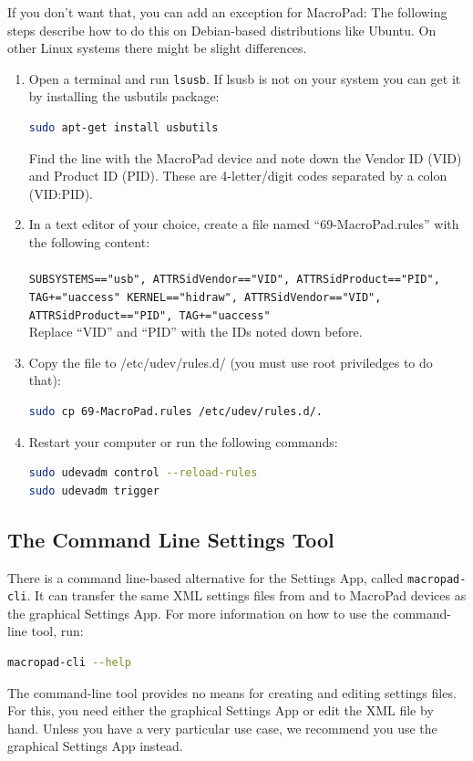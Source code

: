 \documentclass{article}
\begin{document}
If you don't want that, you can add an exception for MacroPad: The following steps describe how to do this on Debian-based distributions like Ubuntu. On other Linux systems there might be slight differences.
\begin{enumerate}
\item Open a terminal and run \lstinline[language=bash]{lsusb}.
If lsusb is not on your system you can get it by installing the usbutils package:
\begin{lstlisting}[language=bash]
sudo apt-get install usbutils
\end{lstlisting}
Find the line with the MacroPad device and note down the Vendor ID (VID) and Product ID (PID). These are 4-letter/digit codes separated by a colon (VID:PID).\\
\item In a text editor of your choice, create a file named ``69-MacroPad.rules'' with the following content:\\
~\\
\texttt{SUBSYSTEMS=="usb", ATTRS{idVendor}=="VID", ATTRS{idProduct}=="PID", TAG+="uaccess"
KERNEL=="hidraw", ATTRS{idVendor}=="VID", ATTRS{idProduct}=="PID", TAG+="uaccess"}
~\\
Replace ``VID'' and ``PID'' with the IDs noted down before.
\item Copy the file to /etc/udev/rules.d/ (you must use root priviledges to do that):
\begin{lstlisting}[language=bash]
sudo cp 69-MacroPad.rules /etc/udev/rules.d/.
\end{lstlisting}
\item Restart your computer or run the following commands:
\begin{lstlisting}[language=bash]
sudo udevadm control --reload-rules
sudo udevadm trigger
\end{lstlisting}
\end{enumerate}

\subsection{The Command Line Settings Tool}\label{sec:cmdline_tool}
There is a command line-based alternative for the Settings App, called \lstinline[language=bash]{macropad-cli}. It can transfer the same XML settings files from and to MacroPad devices as the graphical Settings App. For more information on how to use the command-line tool, run:
\begin{lstlisting}[language=bash]
macropad-cli --help
\end{lstlisting}
The command-line tool provides no means for creating and editing settings files. For this, you need either the graphical Settings App or edit the XML file by hand.
Unless you have a very particular use case, we recommend you use the graphical Settings App instead.
\end{document}
